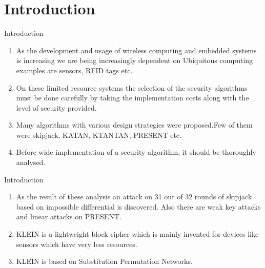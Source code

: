 \section{Introduction}

\begin{frame}{Introduction}
\begin{enumerate}
    \item As the development and usage of wireless computing and embedded systems is increasing we are being increasingly dependent on Ubiquitous computing examples are sensors, RFID tags etc.
    \item On these limited resource systems the selection of the security algorithms must be done carefully by taking the implementation costs along with the level of security provided.
    \item Many algorithms with various design strategies were proposed.Few of them were skipjack, KATAN\cite{KATAN}, KTANTAN\cite{KATAN}, PRESENT\cite{PRESENT} etc.
    \item Before wide implementation of a security algorithm, it should be thoroughly analysed.
    \seti
\end{enumerate}
\end{frame}

\begin{frame}{Introduction}
\begin{enumerate}
    \conti
    \item As the result of these analysis an attack on 31 out of 32 rounds of skipjack based on impossible differential is discovered. Also there are weak key attacks and linear attacks on PRESENT.
    \item  KLEIN is a lightweight block cipher which is mainly invented for devices like sensors which have very less resources.
    \item KLEIN is based on Substitution Permutation Networks.
    \seti
\end{enumerate}
\end{frame}